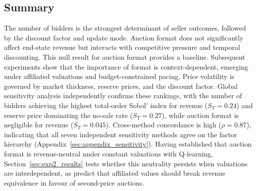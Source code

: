 \subsection{Summary}

The number of bidders is the strongest determinant of seller outcomes, followed by the discount factor and update mode. Auction format does not significantly affect end-state revenue but interacts with competitive pressure and temporal discounting. This null result for auction format provides a baseline. Subsequent experiments show that the importance of format is context-dependent, emerging under affiliated valuations and budget-constrained pacing. Price volatility is governed by market thickness, reserve prices, and the discount factor. Global sensitivity analysis independently confirms these rankings, with the number of bidders achieving the highest total-order Sobol' index for revenue ($S_T = 0.24$) and reserve price dominating the no-sale rate ($S_T = 0.27$), while auction format is negligible for revenue ($S_T = 0.045$). Cross-method concordance is high ($\rho = 0.87$), indicating that all seven independent sensitivity methods agree on the factor hierarchy (Appendix~\ref{sec:appendix_sensitivity}). Having established that auction format is revenue-neutral under constant valuations with Q-learning, Section~\ref{sec:exp2_results} tests whether this neutrality persists when valuations are interdependent, as \citet{MilgromWeber1982} predict that affiliated values should break revenue equivalence in favour of second-price auctions.
